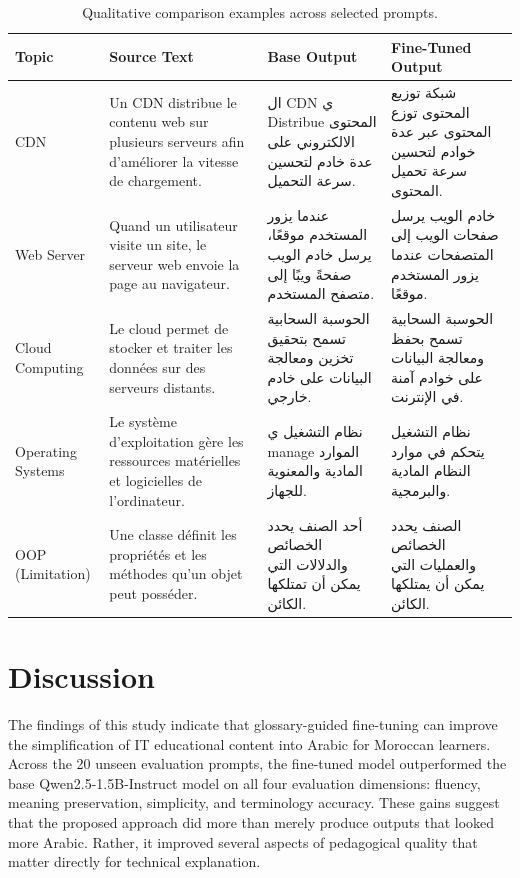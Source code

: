 \documentclass[education,article,submit,moreauthors]{Definitions/mdpi}
\begin{document}
\begin{table}[H]
\caption{Qualitative comparison examples across selected prompts.}
\label{tab:qual_examples}
\centering
\begin{tabular}{p{} p{} p{} p{}}
\toprule
\textbf{Topic} & \textbf{Source Text} & \textbf{Base Output} & \textbf{Fine-Tuned Output} \\
\midrule
CDN & Un CDN distribue le contenu web sur plusieurs serveurs afin d’améliorer la vitesse de chargement. & \textarabic{ال \textenglish{CDN} ي \textenglish{Distribue} المحتوى الالكتروني على عدة خادم لتحسين سرعة التحميل.} & \textarabic{شبكة توزيع المحتوى توزع المحتوى عبر عدة خوادم لتحسين سرعة تحميل المحتوى.} \\

Web Server & Quand un utilisateur visite un site, le serveur web envoie la page au navigateur. & \textarabic{عندما يزور المستخدم موقعًا، يرسل خادم الويب صفحةً ويبًا إلى متصفح المستخدم.} & \textarabic{خادم الويب يرسل صفحات الويب إلى المتصفحات عندما يزور المستخدم موقعًا.} \\

Cloud Computing & Le cloud permet de stocker et traiter les données sur des serveurs distants. & \textarabic{الحوسبة السحابية تسمح بتحقيق تخزين ومعالجة البيانات على خادم خارجي.} & \textarabic{الحوسبة السحابية تسمح بحفظ ومعالجة البيانات على خوادم آمنة في الإنترنت.} \\

Operating Systems & Le système d'exploitation gère les ressources matérielles et logicielles de l’ordinateur. & \textarabic{نظام التشغيل ي \textenglish{manage} الموارد المادية والمعنوية للجهاز.} & \textarabic{نظام التشغيل يتحكم في موارد النظام المادية والبرمجية.} \\

OOP (Limitation) & Une classe définit les propriétés et les méthodes qu’un objet peut posséder. & \textarabic{أحد الصنف يحدد الخصائص والدلالات التي يمكن أن تمتلكها الكائن.} & \textarabic{الصنف يحدد الخصائص والعمليات التي يمكن أن يمتلكها الكائن.} \\
\bottomrule
\end{tabular}
\end{table}

\section{Discussion}

The findings of this study indicate that glossary-guided fine-tuning can improve the simplification of IT educational content into Arabic for Moroccan learners. Across the 20 unseen evaluation prompts, the fine-tuned model outperformed the base Qwen2.5-1.5B-Instruct model on all four evaluation dimensions: fluency, meaning preservation, simplicity, and terminology accuracy. These gains suggest that the proposed approach did more than merely produce outputs that looked more Arabic. Rather, it improved several aspects of pedagogical quality that matter directly for technical explanation.
\end{document}

